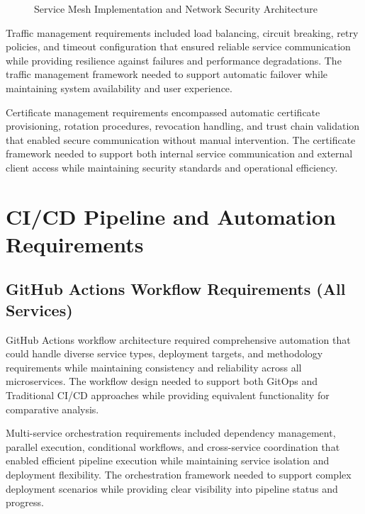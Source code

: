 \begin{figure}[H]
\centering
\caption{Service Mesh Implementation and Network Security Architecture}
\label{fig:service-mesh-architecture}
\end{figure}

Traffic management requirements included load balancing, circuit breaking, retry policies, and timeout configuration that ensured reliable service communication while providing resilience against failures and performance degradations. The traffic management framework needed to support automatic failover while maintaining system availability and user experience.

Certificate management requirements encompassed automatic certificate provisioning, rotation procedures, revocation handling, and trust chain validation that enabled secure communication without manual intervention. The certificate framework needed to support both internal service communication and external client access while maintaining security standards and operational efficiency.

\section{CI/CD Pipeline and Automation Requirements}

\subsection{GitHub Actions Workflow Requirements (All Services)}

GitHub Actions workflow architecture required comprehensive automation that could handle diverse service types, deployment targets, and methodology requirements while maintaining consistency and reliability across all microservices. The workflow design needed to support both GitOps and Traditional CI/CD approaches while providing equivalent functionality for comparative analysis.

Multi-service orchestration requirements included dependency management, parallel execution, conditional workflows, and cross-service coordination that enabled efficient pipeline execution while maintaining service isolation and deployment flexibility. The orchestration framework needed to support complex deployment scenarios while providing clear visibility into pipeline status and progress.

